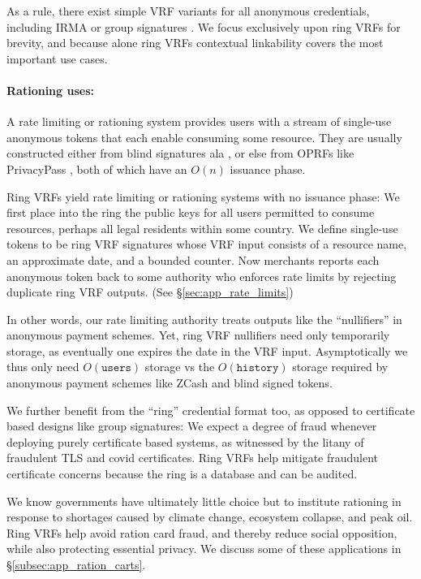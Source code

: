 As a rule, there exist simple VRF variants for all anonymous credentials,
including IRMA \cite{IRMAcredentials} or group signatures \cite{group_sig_survey}.
We focus exclusively upon ring VRFs for brevity, and because alone
ring VRFs contextual linkability covers the most important use cases.

\paragraph{Rationing uses:}

A rate limiting or rationing system provides users with a stream
of single-use anonymous tokens that each enable consuming some resource.
They are usually constructed either
from blind signatures ala \cite{chaum83}, or else
from OPRFs like PrivacyPass \cite{PrivacyPass},
both of which have an $O(n)$ issuance phase.

Ring VRFs yield rate limiting or rationing systems with no issuance phase:
We first place into the ring the public keys for all users permitted to
consume resources, perhaps all legal residents within some country.  
We define single-use tokens to be ring VRF signatures whose VRF input
consists of a resource name, an approximate date, and a bounded counter.
Now merchants reports each anonymous token back to some authority who
enforces rate limits by rejecting duplicate ring VRF outputs.
(See \S\ref{sec:app_rate_limits})

In other words, our rate limiting authority treats outputs like the
``nullifiers'' in anonymous payment schemes.
Yet, ring VRF nullifiers need only temporarily storage, as eventually one
expires the date in the VRF input.  Asymptotically we thus only need
$O(\mathtt{users})$ storage vs the $O(\mathtt{history})$ storage
required by anonymous payment schemes like ZCash and blind signed tokens.

We further benefit from the ``ring'' credential format too,
as opposed to certificate based designs like group signatures:
We expect a degree of fraud whenever deploying purely certificate
based systems, as witnessed by the litany of fraudulent TLS and covid
certificates.  Ring VRFs help mitigate fraudulent certificate concerns
because the ring is a database and can be audited.

We know governments have ultimately little choice but to institute
rationing in response to shortages caused by climate change, ecosystem
collapse, and peak oil.  Ring VRFs help avoid ration card fraud,
and thereby reduce social opposition, while also protecting essential privacy. We discuss some of these 
applications in \S\ref{subsec:app_ration_carts}.
%

